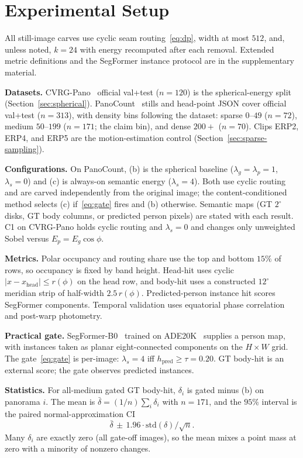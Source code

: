 \section{Experimental Setup}
\label{sec:setup}

All still-image carves use cyclic seam routing~\eqref{eq:dp},
width at most $512$, and, unless noted, $k=24$ with energy
recomputed after each removal. Extended metric definitions and
the SegFormer instance protocol are in the supplementary
material.

\textbf{Datasets.}
{CVRG-Pano}~\cite{orhan2021semantic} official val+test ($n=120$)
is the spherical-energy split (Section~\ref{sec:spherical}).
PanoCount~\cite{arbi2025panocount} stills and head-point JSON
cover official val+test ($n=313$), with density bins following
the dataset: sparse $0$--$49$ ($n=72$), medium $50$--$199$
($n=171$; the claim bin), and dense $200+$ ($n=70$). Clips ERP2,
ERP4, and ERP5 are the motion-estimation control
(Section~\ref{sec:sparse-sampling}).

\textbf{Configurations.}
On PanoCount, (b) is the spherical baseline
($\lambda_g=\lambda_p=1$, $\lambda_s=0$) and (c) is always-on
semantic energy ($\lambda_s=4$). Both use cyclic routing and are
carved independently from the original image; the
content-conditioned method selects (c) if~\eqref{eq:gate} fires
and (b) otherwise. Semantic maps (GT $2^\circ$ disks, GT body
columns, or predicted person pixels) are stated with each result.
C1 on CVRG-Pano holds cyclic routing and $\lambda_s=0$ and
changes only unweighted Sobel versus $E_p=E_g\cos\phi$.

\textbf{Metrics.}
Polar occupancy and routing share use the top and bottom $15\%$
of rows, so occupancy is fixed by band height. Head-hit uses
cyclic $|x-x_{\mathrm{head}}|\le r(\phi)$ on the head row, and
body-hit uses a constructed $12^\circ$ meridian strip of
half-width $2.5\,r(\phi)$. Predicted-person instance hit scores
SegFormer components. Temporal validation uses equatorial phase
correlation~\cite{reddy1996fft} and post-warp photometry.

\textbf{Practical gate.}
SegFormer-B0~\cite{xie2021segformer} trained on
{ADE20K}~\cite{zhou2017ade20k} supplies a person map, with
instances taken as planar eight-connected components on the
$H\times W$ grid. The gate~\eqref{eq:gate} is per-image:
$\lambda_s=4$ iff $h_{\mathrm{pred}}\ge\tau=0.20$. GT body-hit is
an external score; the gate observes predicted instances.

\textbf{Statistics.}
For all-medium gated GT body-hit, $\delta_i$ is gated minus (b)
on panorama $i$. The mean is $\bar{\delta}=(1/n)\sum_i\delta_i$
with $n=171$, and the $95\%$ interval is the paired
normal-approximation CI
\begin{equation}
\label{eq:ci}
\bar{\delta}\,\pm\,1.96\cdot\mathrm{std}(\delta)/\sqrt{n}.
\end{equation}
Many $\delta_i$ are exactly zero (all gate-off images), so the
mean mixes a point mass at zero with a minority of nonzero
changes.
